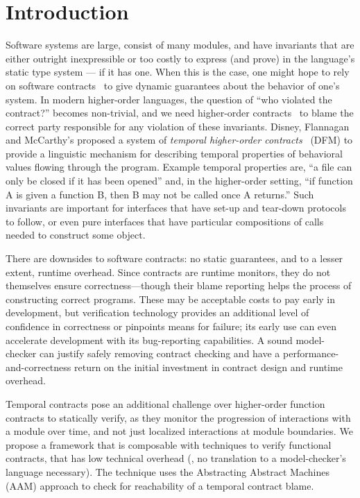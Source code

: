 \section{Introduction}

Software systems are large, consist of many modules, and have invariants that are either outright inexpressible or too costly to express (and prove) in the language's static type system --- if it has one.
%
When this is the case, one might hope to rely on software contracts~\cite{dvanhorn:meyer-eiffel} to give dynamic guarantees about the behavior of one's system.
%
In modern higher-order languages, the question of ``who violated the contract?'' becomes non-trivial, and we need higher-order contracts~\citep{dvanhorn:Findler2002Contracts} to blame the correct party responsible for any violation of these invariants.
%
Disney, Flannagan and McCarthy's proposed a system of \emph{temporal higher-order contracts}~\citep{ianjohnson:dfm:icfp2011} (DFM) to provide a linguistic mechanism for describing temporal properties of behavioral values flowing through the program.
%
%
Example temporal properties are, ``a file can only be closed if it has been opened'' and, in the higher-order setting, ``if function A is given a function B, then B may not be called once A returns.''
%
Such invariants are important for interfaces that have set-up and tear-down protocols to follow, or even pure interfaces that have particular compositions of calls needed to construct some object.

There are downsides to software contracts: no static guarantees, and to a lesser extent, runtime overhead.
%
Since contracts are runtime monitors, they do not themselves ensure correctness---though their blame reporting helps the process of constructing correct programs.
%
These may be acceptable costs to pay early in development, but verification technology provides an additional level of confidence in correctness or pinpoints means for failure; its early use can even accelerate development with its bug-reporting capabilities.
%
A sound model-checker can justify safely removing contract checking and have a performance-and-correctness return on the initial investment in contract design and runtime overhead.

Temporal contracts pose an additional challenge over higher-order function contracts to statically verify, as they monitor the progression of interactions with a module over time, and not just localized interactions at module boundaries.
%
We propose a framework that is composable with techniques to verify functional contracts, that has low technical overhead (\eg, no translation to a model-checker's language necessary).
%
The technique uses the Abstracting Abstract Machines (AAM) approach \citep{dvanhorn:VanHorn2010Abstracting} to check for reachability of a temporal contract blame.

